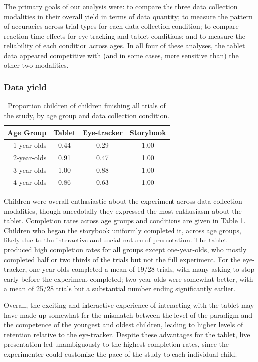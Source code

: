 \documentclass[man,noapacite]{apa2}
\begin{document}
The primary goals of our analysis were: to compare the three data collection modalities in their overall yield in terms of data quantity; to measure the pattern of accuracies across trial types for each data collection condition; to compare reaction time effects for eye-tracking and tablet conditions; and to measure the reliability of each condition across ages. In all four of these analyses, the tablet data appeared competitive with (and in some cases, more sensitive than) the other two modalities. 

\subsubsection{Data yield} 

\begin{table}[t]
\centering
\caption{Proportion children of children finishing all trials of the study, by age group and data collection condition.\label{tab:completion}}

\begin{tabular}{rccc}
  \hline
Age Group & Tablet & Eye-tracker & Storybook \\ 
  \hline
1-year-olds & 0.44 & 0.29& 1.00 \\ 
2-year-olds & 0.91 & 0.47 & 1.00\\ 
3-year-olds & 1.00 & 0.88 & 1.00\\ 
4-year-olds & 0.86 & 0.63 & 1.00\\ 
   \hline
\end{tabular}
\end{table}

Children were overall enthusiastic about the experiment across data collection modalities, though anecdotally they expressed the most enthusiasm about the tablet. Completion rates across age groups and conditions are given in Table \ref{tab:completion}. Children who began the storybook uniformly completed it, across age groups, likely due to the interactive and social nature of presentation. The tablet produced high completion rates for all groups except one-year-olds, who mostly completed half or two thirds of the trials but not the full experiment. For the eye-tracker, one-year-olds completed a mean of 19/28 trials, with many asking to stop early before the experiment completed; two-year-olds were somewhat better, with a mean of 25/28 trials but a substantial number ending significantly earlier. 

Overall, the exciting and interactive experience of interacting with the tablet may have made up somewhat for the mismatch between the level of the paradigm and the competence of the youngest and oldest children, leading to higher levels of retention relative to the eye-tracker. Despite these advantages for the tablet, live presentation led unambiguously to the highest completion rates, since the experimenter could customize the pace of the study to each individual child.
\end{document}

